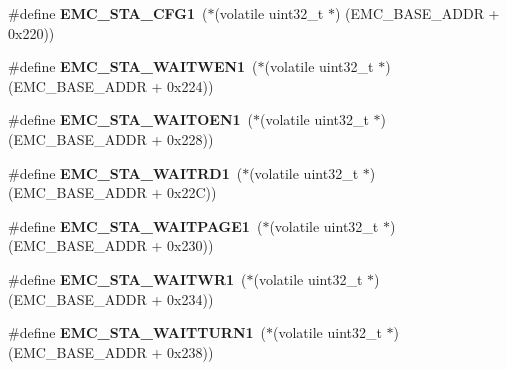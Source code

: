 \begin{DoxyCompactItemize}
\item 
\mbox{\label{group__lpc24xx__regs_ga3d5743d7619fa807bc4eaac5183ecd2d}} 
\#define {\bfseries E\+M\+C\+\_\+\+S\+T\+A\+\_\+\+C\+F\+G1}~($\ast$(volatile uint32\+\_\+t $\ast$) (E\+M\+C\+\_\+\+B\+A\+S\+E\+\_\+\+A\+D\+DR + 0x220))
\item 
\mbox{\label{group__lpc24xx__regs_ga63bdab97abf2c635ae9ea83751f85244}} 
\#define {\bfseries E\+M\+C\+\_\+\+S\+T\+A\+\_\+\+W\+A\+I\+T\+W\+E\+N1}~($\ast$(volatile uint32\+\_\+t $\ast$) (E\+M\+C\+\_\+\+B\+A\+S\+E\+\_\+\+A\+D\+DR + 0x224))
\item 
\mbox{\label{group__lpc24xx__regs_gaa4807be8fc2a57229646a376afb5da6a}} 
\#define {\bfseries E\+M\+C\+\_\+\+S\+T\+A\+\_\+\+W\+A\+I\+T\+O\+E\+N1}~($\ast$(volatile uint32\+\_\+t $\ast$) (E\+M\+C\+\_\+\+B\+A\+S\+E\+\_\+\+A\+D\+DR + 0x228))
\item 
\mbox{\label{group__lpc24xx__regs_gae7aaab1ae42ccd7fc27c3927b863e032}} 
\#define {\bfseries E\+M\+C\+\_\+\+S\+T\+A\+\_\+\+W\+A\+I\+T\+R\+D1}~($\ast$(volatile uint32\+\_\+t $\ast$) (E\+M\+C\+\_\+\+B\+A\+S\+E\+\_\+\+A\+D\+DR + 0x22\+C))
\item 
\mbox{\label{group__lpc24xx__regs_ga6cd605c69b3456bd150a6be61bfaaeda}} 
\#define {\bfseries E\+M\+C\+\_\+\+S\+T\+A\+\_\+\+W\+A\+I\+T\+P\+A\+G\+E1}~($\ast$(volatile uint32\+\_\+t $\ast$) (E\+M\+C\+\_\+\+B\+A\+S\+E\+\_\+\+A\+D\+DR + 0x230))
\item 
\mbox{\label{group__lpc24xx__regs_gaf6c45caf882f27237aef691be08bfa68}} 
\#define {\bfseries E\+M\+C\+\_\+\+S\+T\+A\+\_\+\+W\+A\+I\+T\+W\+R1}~($\ast$(volatile uint32\+\_\+t $\ast$) (E\+M\+C\+\_\+\+B\+A\+S\+E\+\_\+\+A\+D\+DR + 0x234))
\item 
\mbox{\label{group__lpc24xx__regs_ga3b79de329b9ee7c064240b18b49f4d48}} 
\#define {\bfseries E\+M\+C\+\_\+\+S\+T\+A\+\_\+\+W\+A\+I\+T\+T\+U\+R\+N1}~($\ast$(volatile uint32\+\_\+t $\ast$) (E\+M\+C\+\_\+\+B\+A\+S\+E\+\_\+\+A\+D\+DR + 0x238))
\item 
\mbox{\label{group__lpc24xx__regs_ga342d13943a97c2d597504f6a678bd853}} 

\end{DoxyCompactItemize}
